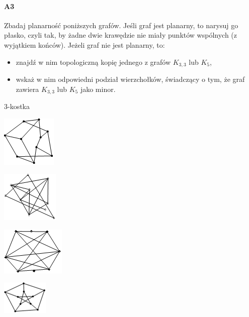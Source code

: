 \documentclass[a4paper,12pt]{article}
\theoremstyle{definition}%
\theoremstyle{definition}
\theoremstyle{problem}
\begin{document}
\paragraph{A3} Zbadaj planarność poniższych grafów. Jeśli graf jest planarny, to narysuj go płasko, czyli tak, by żadne dwie krawędzie nie miały punktów wspólnych (z wyjątkiem końców). Jeżeli graf nie jest planarny, to:
\begin{itemize}
\item znajdź w nim topologiczną kopię jednego z grafów $K_{3,3}$ lub $K_5$,
\item wskaż w nim odpowiedni podział wierzchołków, świadczący o tym, że graf zawiera $K_{3,3}$ lub $K_5$ jako minor.
\end{itemize}
\begin{enumerate}[label=\alph*)]
\begin{minipage}{.25\textwidth}
\item 3-kostka
\end{minipage}
\begin{minipage}{.25\textwidth}
\item \includegraphics{img/g4}
\end{minipage}
\begin{minipage}{.25\textwidth}
\item \includegraphics{img/g5}
\end{minipage}
\begin{minipage}{.25\textwidth}
\item \includegraphics{img/g6}
\end{minipage}
\begin{minipage}{.25\textwidth}
\item \includegraphics{img/g7}
\end{minipage}
\end{enumerate}
\end{document}
